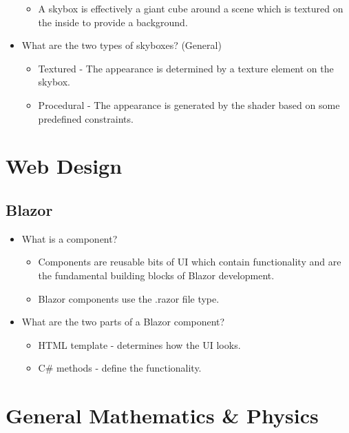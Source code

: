 \documentclass{article}
\begin{document}
\begin{itemize}
    \begin{itemize}
        \item A skybox is effectively a giant cube around a scene which is textured on the inside to provide a background.
    \end{itemize}
    \item What are the two types of skyboxes? (General)
    \begin{itemize}
        \item Textured - The appearance is determined by a texture element on the skybox.
        \item Procedural - The appearance is generated by the shader based on some predefined constraints.
    \end{itemize}
\end{itemize}




\newpage
\section{Web Design}
\subsection{Blazor}
\begin{itemize}
    \item What is a component?
    \begin{itemize}
        \item Components are reusable bits of UI which contain functionality and are the fundamental building blocks of Blazor development.
        \item Blazor components use the .razor file type.
    \end{itemize}
    \item What are the two parts of a Blazor component?
    \begin{itemize}
        \item HTML template - determines how the UI looks.
        \item C\# methods - define the functionality.
    \end{itemize}
\end{itemize}

\newpage
\section{General Mathematics \& Physics}
\end{document}
